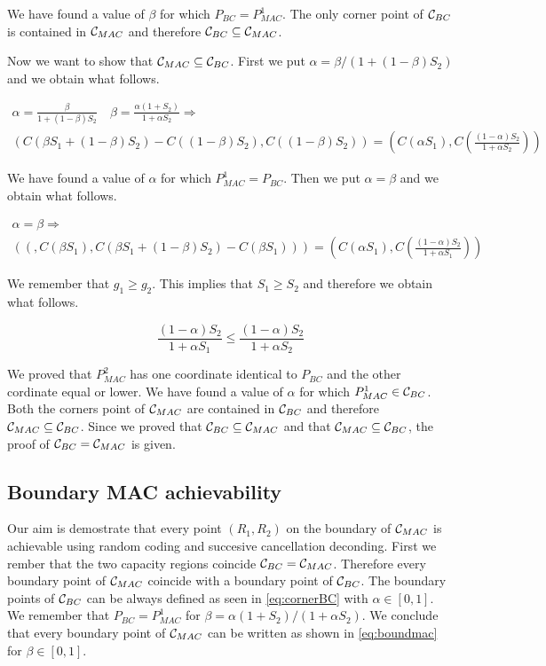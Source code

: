 We have found a value of $\beta$ for which $P_{BC} = P_{MAC}^1$. The only corner point of $\mathcal{C}_{BC}$ is contained in $\mathcal{C}_{MAC}$ and therefore $\mathcal{C}_{BC} \subseteq \mathcal{C}_{MAC}$.

Now we want to show that $\mathcal{C}_{MAC} \subseteq \mathcal{C}_{BC}$. First we put $\alpha = \beta / (1+(1-\beta)S_2)$ and we obtain what follows.

\begin{gather*}
	\alpha = \frac{\beta}{1+ (1-\beta) S_2} \quad \beta = \frac{\alpha(1+S_2)}{1+\alpha S_2}  \Rightarrow \\
	\left( C (\beta S_1 + (1-\beta)S_2) - C((1-\beta)S_2) , C \left( (1-\beta)S_2 \right) \right)
	= \left( C(\alpha S_1) , C \left( \frac{(1-\alpha)S_2}{1+\alpha S_2} \right) \right)
\end{gather*}

We have found a value of $\alpha$ for which $P_{MAC}^1 = P_{BC}$. Then we put $\alpha = \beta$ and we obtain what follows.

\begin{gather*}
	\alpha = \beta \Rightarrow \\
	(\left( , C \left(\beta S_1 \right), C (\beta S_1 + (1-\beta)S_2) - C(\beta S_1) \right)) =  \left( C \left(\alpha S_1 \right), C \left( \frac{(1-\alpha)S_2}{1 + \alpha S_1}\right) \right)
\end{gather*}

We remember that $g_1 \geq g_2$. This implies that $S_1 \geq S_2$ and therefore we obtain what follows.

\begin{equation*}
	\frac{(1-\alpha)S_2}{1 + \alpha S_1} \leq \frac{(1-\alpha)S_2}{1 + \alpha S_2}
\end{equation*}

We proved that $P_{MAC}^2$ has one coordinate identical to $P_{BC}$ and the other cordinate equal or lower. We have found a value of $\alpha$ for which $P_{MAC}^1 \in \mathcal{C}_{BC}$. Both the corners point of $\mathcal{C}_{MAC}$ are contained in $\mathcal{C}_{BC}$ and therefore $\mathcal{C}_{MAC} \subseteq \mathcal{C}_{BC}$. Since we proved that $\mathcal{C}_{BC} \subseteq \mathcal{C}_{MAC}$ and that $\mathcal{C}_{MAC} \subseteq \mathcal{C}_{BC}$, the proof of $\mathcal{C}_{BC}=\mathcal{C}_{MAC}$ is given.

\subsection{Boundary MAC achievability}

Our aim is demostrate that every point $(R_1,R_2)$ on the boundary of $\mathcal{C}_{MAC}$ is achievable using random coding and succesive cancellation deconding. First we rember that the two capacity regions coincide $\mathcal{C}_{BC}=\mathcal{C}_{MAC}$. Therefore every boundary point of $\mathcal{C}_{MAC}$ coincide with a boundary point of $\mathcal{C}_{BC}$. The boundary points of $\mathcal{C}_{BC}$ can be always defined as seen in \eqref{eq:cornerBC} with $\alpha \in [0,1]$. We remember that $P_{BC} = P_{MAC}^1$ for $\beta = \alpha(1+S_2)/(1+\alpha S_2)$. We conclude that every boundary point of $\mathcal{C}_{MAC}$ can be written as shown in \eqref{eq:boundmac} for $\beta \in [0,1]$.

